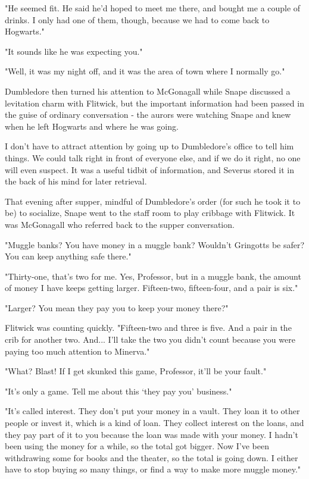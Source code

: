 "He seemed fit. He said he'd hoped to meet me there, and bought me a couple of drinks. I only had one of them, though, because we had to come back to Hogwarts."

"It sounds like he was expecting you."

"Well, it was my night off, and it was the area of town where I normally go."

Dumbledore then turned his attention to McGonagall while Snape discussed a levitation charm with Flitwick, but the important information had been passed in the guise of ordinary conversation - the aurors were watching Snape and knew when he left Hogwarts and where he was going.

I don't have to attract attention by going up to Dumbledore's office to tell him things. We could talk right in front of everyone else, and if we do it right, no one will even suspect. It was a useful tidbit of information, and Severus stored it in the back of his mind for later retrieval.

That evening after supper, mindful of Dumbledore's order (for such he took it to be) to socialize, Snape went to the staff room to play cribbage with Flitwick. It was McGonagall who referred back to the supper conversation.

"Muggle banks? You have money in a muggle bank? Wouldn't Gringotts be safer? You can keep anything safe there."

"Thirty-one, that's two for me. Yes, Professor, but in a muggle bank, the amount of money I have keeps getting larger. Fifteen-two, fifteen-four, and a pair is six."

"Larger? You mean they pay you to keep your money there?"

Flitwick was counting quickly. "Fifteen-two and three is five. And a pair in the crib for another two. And... I'll take the two you didn't count because you were paying too much attention to Minerva."

"What? Blast! If I get skunked this game, Professor, it'll be your fault."

"It's only a game. Tell me about this `they pay you' business."

"It's called interest. They don't put your money in a vault. They loan it to other people or invest it, which is a kind of loan. They collect interest on the loans, and they pay part of it to you because the loan was made with your money. I hadn't been using the money for a while, so the total got bigger. Now I've been withdrawing some for books and the theater, so the total is going down. I either have to stop buying so many things, or find a way to make more muggle money."

